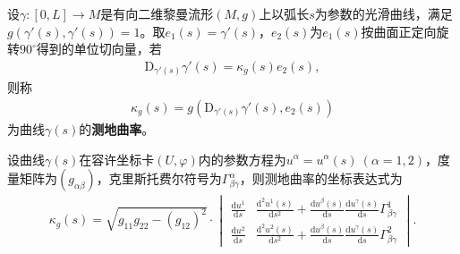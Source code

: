 \documentclass[../../main.tex]{subfiles}%
\begin{document}
\begin{definition}
设$\gamma:[0,L]\to M$是有向二维黎曼流形$(M,g)$上以弧长$s$为参数的光滑曲线，满足$g(\gamma'(s),\gamma'(s))=1$。取$e_1(s)=\gamma'(s)$，$e_2(s)$为$e_1(s)$按曲面正定向旋转$90^\circ$得到的单位切向量，若
\begin{align}
\mathrm{D}_{\gamma'(s)}\gamma'(s)=\kappa_g(s)e_2(s),\label{eq:7.16}
\end{align}
则称
\begin{align*}
\kappa_g(s)=g\left(\mathrm{D}_{\gamma'(s)}\gamma'(s),e_2(s)\right)
\end{align*}
为曲线$\gamma(s)$的\textbf{测地曲率}。
\end{definition}

\begin{proposition}
设曲线$\gamma(s)$在容许坐标卡$(U,\varphi)$内的参数方程为$u^\alpha=u^\alpha(s)\ (\alpha=1,2)$，度量矩阵为$(g_{\alpha\beta})$，克里斯托费尔符号为$\Gamma^\alpha_{\beta\gamma}$，则测地曲率的坐标表达式为
\begin{align}
\kappa_g(s)=\sqrt{g_{11}g_{22}-(g_{12})^2}\cdot
\begin{vmatrix}
\frac{\mathrm{d}u^1}{\mathrm{d}s} & \frac{\mathrm{d}^2u^1(s)}{\mathrm{d}s^2}+\frac{\mathrm{d}u^\beta(s)}{\mathrm{d}s}\frac{\mathrm{d}u^\gamma(s)}{\mathrm{d}s}\Gamma^1_{\beta\gamma} \\
\frac{\mathrm{d}u^2}{\mathrm{d}s} & \frac{\mathrm{d}^2u^2(s)}{\mathrm{d}s^2}+\frac{\mathrm{d}u^\beta(s)}{\mathrm{d}s}\frac{\mathrm{d}u^\gamma(s)}{\mathrm{d}s}\Gamma^2_{\beta\gamma}
\end{vmatrix}.\label{eq:7.19}
\end{align}
\end{proposition}
\end{document}
